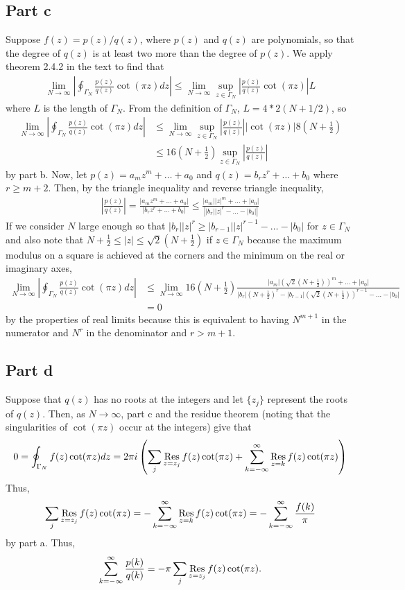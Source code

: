 \documentclass{article}
\begin{document}
\subsection{Part c}
Suppose $f(z)=p(z)/q(z)$, where $p(z)$ and $q(z)$ are polynomials, so that the degree of $q(z)$ is at least two more than	the degree of $p(z)$. We apply theorem 2.4.2 in the text to find that 
\begin{align*}
\lim_{N\to \infty}\left|\oint_{\Gamma_N}\frac{p(z)}{q(z)}\cot(\pi z)dz\right|\leq\lim_{N\to \infty}\sup_{z\in\Gamma_N}\left|\frac{p(z)}{q(z)}\cot(\pi z)\right|L
\end{align*}
where $L$ is the length of $\Gamma_N$. From the definition of $\Gamma_N$, $L=4*2(N+1/2)$, so 
\begin{align*}
\lim_{N\to \infty}\left|\oint_{\Gamma_N}\frac{p(z)}{q(z)}\cot(\pi z)dz\right|&\leq\lim_{N\to \infty}\sup_{z\in\Gamma_N}\left|\frac{p(z)}{q(z)}\right||\cot(\pi z)|8\left(N+\frac{1}{2}\right)\\&\leq
16\left(N+\frac{1}{2}\right)\sup_{z\in\Gamma_N}\left|\frac{p(z)}{q(z)}\right|
\end{align*}
by part b. Now, let $p(z)=a_mz^m+\ldots+a_0$ and $q(z)=b_rz^r+\ldots+b_0$ where $r\geq m+2$. Then, by the triangle inequality and reverse triangle inequality, 
\begin{align*}
\left|\frac{p(z)}{q(z)}\right|=\frac{|a_mz^m+\ldots+a_0|}{|b_rz^r+\ldots+b_0|}\leq\frac{|a_m||z|^m+\ldots+|a_0|}{\left||b_r||z|^r-\ldots-|b_0|\right|}
\end{align*}
If we consider $N$ large enough so that $|b_r||z|^r\geq|b_{r-1}||z|^{r-1}-\ldots-|b_0|$ for $z\in\Gamma_N$ and also note that $N+\frac{1}{2}\leq|z|\leq\sqrt{2}\left(N+\frac{1}{2}\right)$ if $z\in\Gamma_N$ because the maximum modulus on a square is achieved at the corners and the minimum on the real or imaginary axes, 
\begin{align*}
\lim_{N\to \infty}\left|\oint_{\Gamma_N}\frac{p(z)}{q(z)}\cot(\pi z)dz\right|&\leq\lim_{N\to \infty}16\left(N+\frac{1}{2}\right)\frac{|a_m|(\sqrt{2}\left(N+\frac{1}{2}\right))^m+\ldots+|a_0|}{|b_r|\left(N+\frac{1}{2}\right)^r-|b_{r-1}|\left(\sqrt{2}\left(N+\frac{1}{2}\right)\right)^{r-1}-\ldots-|b_0|}\\&=0
\end{align*}
by the properties of real limits because this is equivalent to having $N^{m+1}$ in the numerator and $N^r$ in the denominator and $r>m+1$.

\subsection{Part d}
Suppose that $q(z)$ has no roots at the integers and let $\{z_j\}$ represent the roots of $q(z)$. Then, as $N\to\infty$, part c and the residue theorem (noting that the singularities of $\cot(\pi z)$ occur at the integers) give that 
\[
0=\oint_{\Gamma_N}f(z)\cot(\pi z)dz=2\pi i\left(\sum_j\operatorname*{Res}_{z=z_j} f(z)\cot(\pi z)+\sum_{k=-\infty}^\infty\operatorname*{Res}_{z=k}f(z)\cot(\pi z)\right)
\]
Thus, 
\[
\sum_j\operatorname*{Res}_{z=z_j} f(z)\cot(\pi z)=-\sum_{k=-\infty}^\infty\operatorname*{Res}_{z=k}f(z)\cot(\pi z)=-\sum_{k=-\infty}^\infty\frac{f(k)}{\pi}
\]
by part a. Thus,
\[
\sum_{k=-\infty}^\infty\frac{p(k)}{q(k)}=-\pi\sum_j\operatorname*{Res}_{z=z_j} f(z)\cot(\pi z).
\]
\end{document}

